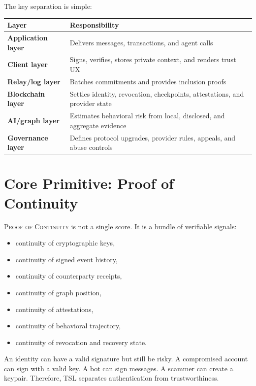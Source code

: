 \documentclass[11pt]{article}
\newcommand{\TSL}{\textsc{TSL}}
\newcommand{\PoC}{\textsc{Proof of Continuity}}
\begin{document}
The key separation is simple:

\begin{center}
\begin{tabularx}{\textwidth}{>{\bfseries}p{} X}
\toprule
Layer & Responsibility \\
\midrule
Application layer & Delivers messages, transactions, and agent calls \\
Client layer & Signs, verifies, stores private context, and renders trust UX \\
Relay/log layer & Batches commitments and provides inclusion proofs \\
Blockchain layer & Settles identity, revocation, checkpoints, attestations, and provider state \\
AI/graph layer & Estimates behavioral risk from local, disclosed, and aggregate evidence \\
Governance layer & Defines protocol upgrades, provider rules, appeals, and abuse controls \\
\bottomrule
\end{tabularx}
\end{center}

\section{Core Primitive: Proof of Continuity}

\PoC{} is not a single score. It is a bundle of verifiable signals:

\begin{itemize}
    \item continuity of cryptographic keys,
    \item continuity of signed event history,
    \item continuity of counterparty receipts,
    \item continuity of graph position,
    \item continuity of attestations,
    \item continuity of behavioral trajectory,
    \item continuity of revocation and recovery state.
\end{itemize}

An identity can have a valid signature but still be risky. A compromised account can sign with a valid key. A bot can sign messages. A scammer can create a keypair. Therefore, \TSL{} separates authentication from trustworthiness.
\end{document}
